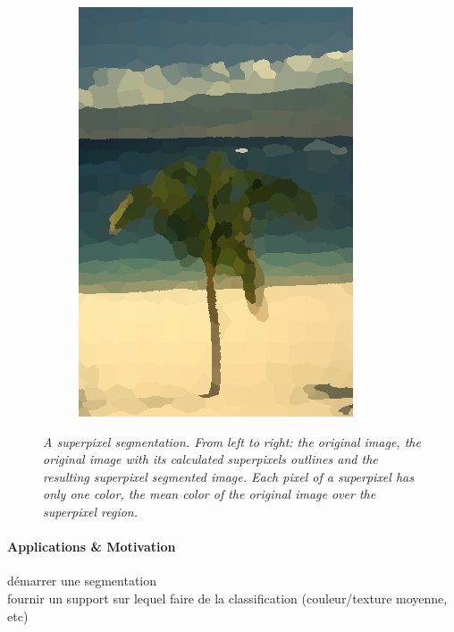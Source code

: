 \documentclass{article}
\begin{document}
\begin{figure}[!ht]
\begin{subfigure}{.3\linewidth}
                \includegraphics[width=0.9\linewidth]{pics/img_segm3.png}
            \end{subfigure}
                \caption{\textit{A superpixel segmentation. From left to right: the original image, the original image with its calculated superpixels outlines and the resulting superpixel segmented image. Each pixel of a superpixel has only one color, the mean color of the original image over the superpixel region.}}
                \label{fig:spp}
            \end{figure}

            \paragraph{Applications \& Motivation}
            démarrer une segmentation\\
            fournir un support sur lequel faire de la classification (couleur/texture moyenne, etc)
\end{document}
